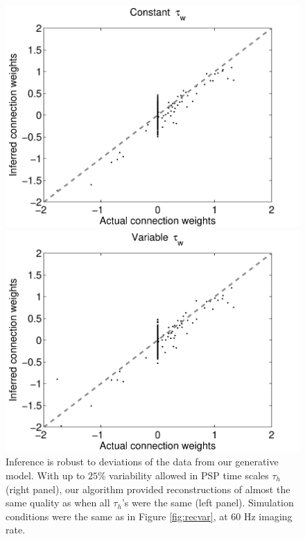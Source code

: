 \documentclass[aoas,preprint]{imsart}
\begin{document}
\begin{figure}[t!]
\centering
\begin{minipage}[c]{0.45\hsize}
\includegraphics[width=\hsize]{../figs/FigureA9_all_same_sol}
\end{minipage}
\begin{minipage}[c]{0.45\hsize}
\includegraphics[width=\hsize]{../figs/FigureA9_variable_25}
\end{minipage}
\caption{Inference is robust to deviations of the data from our
generative model. With up to $25\%$ variability allowed in PSP time
scales $\tau_h$ (right panel), our algorithm provided reconstructions
of almost the same quality as when all $\tau_h$'s were the same (left
panel). Simulation conditions were the same as in Figure
\ref{fig:recvar}, at $60$ Hz imaging rate.}
\label{fig:vartau}
\end{figure}
\end{document}
